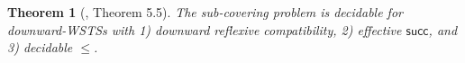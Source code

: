 \documentclass[preprint,12pt]{elsarticle}
\newtheorem{theorem}{Theorem}
\newcommand\Aa{{\mathcal{A} }}
\newcommand\Pp{{\mathcal{P} }}
\newcommand{\hide}[1]{}
\newcommand\Succ{\mathsf{succ}}
\newcommand{\tl}[1]{\color{magenta} {TL: #1 :LT} \color{black}}
\newcommand{\tl}[1]{}
\begin{document}
\begin{theorem}[\cite{FS01}, Theorem 5.5]\label{thm-dwsts}
The sub-covering problem is decidable for downward-WSTSs with 1) downward reflexive compatibility,  2) effective $\Succ$, and 3) decidable $\le$.
\end{theorem}



%
\end{document}
